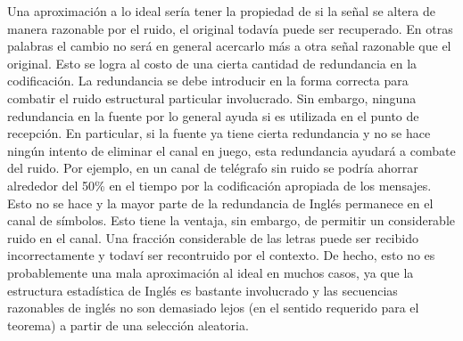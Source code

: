 Una aproximaci\'{o}n a lo ideal ser\'{i}a tener la propiedad de si la
se\~{n}al se altera de manera razonable por el ruido, el original
todav\'{i}a puede ser recuperado. En otras palabras el cambio no
ser\'{a} en general acercarlo m\'{a}s a otra se\~{n}al razonable que
el original. Esto se logra al costo de una cierta cantidad de
redundancia en la codificaci\'{o}n. La redundancia se debe introducir
en la forma correcta para combatir el ruido estructural particular
involucrado. Sin embargo, ninguna redundancia en la fuente por lo
general ayuda si es utilizada en el punto de recepci\'{o}n. En
particular, si la fuente ya tiene cierta redundancia y no se hace
ning\'{u}n intento de eliminar el canal en juego, esta redundancia
ayudar\'{a} a combate del ruido. Por ejemplo, en un canal de
tel\'{e}grafo sin ruido se podr\'{i}a ahorrar alrededor del 50\% en el
tiempo por la codificaci\'{o}n apropiada de los mensajes. Esto no se
hace y la mayor parte de la redundancia de Ingl\'{e}s permanece en el
canal de s\'{i}mbolos. Esto tiene la ventaja, sin embargo, de permitir
un considerable ruido en el canal. Una fracci\'{o}n considerable de
las letras puede ser recibido incorrectamente y todav\'{i} ser
recontruido por el contexto. De hecho, esto no es probablemente una
mala aproximaci\'{o}n al ideal en muchos casos, ya que la estructura
estad\'{i}stica de Ingl\'{e}s es bastante involucrado y las secuencias
razonables de ingl\'{e}s no son demasiado lejos (en el sentido
requerido para el teorema) a partir de una selecci\'{o}n aleatoria.

